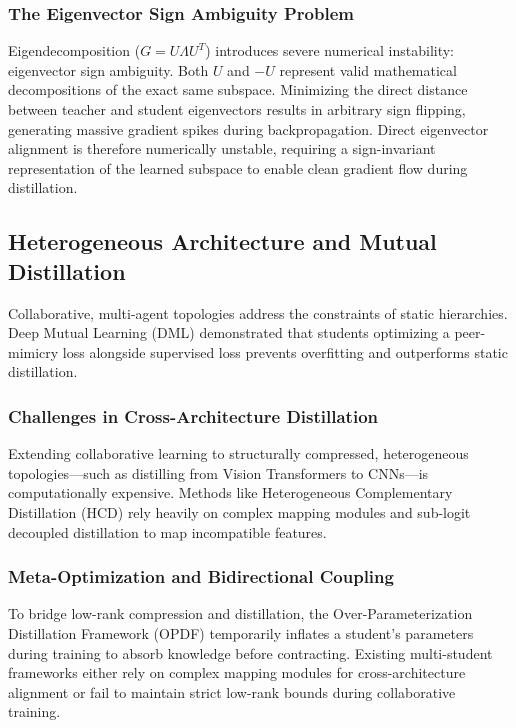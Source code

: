 \documentclass[conference]{IEEEtran}
\begin{document}
\subsubsection{The Eigenvector Sign Ambiguity Problem}
\par
Eigendecomposition ($G = U \Lambda U^T$) introduces severe numerical instability: eigenvector sign ambiguity. Both $U$ and $-U$ represent valid mathematical decompositions of the exact same subspace. Minimizing the direct distance between teacher and student eigenvectors results in arbitrary sign flipping, generating massive gradient spikes during backpropagation. Direct eigenvector alignment is therefore numerically unstable, requiring a sign-invariant representation of the learned subspace to enable clean gradient flow during distillation.


\subsection{Heterogeneous Architecture and Mutual Distillation}
\par
Collaborative, multi-agent topologies address the constraints of static hierarchies. Deep Mutual Learning (DML) \cite{zhang2018deep} demonstrated that students optimizing a peer-mimicry loss alongside supervised loss prevents overfitting and outperforms static distillation.


\subsubsection{Challenges in Cross-Architecture Distillation}
\par
Extending collaborative learning to structurally compressed, heterogeneous topologies—such as distilling from Vision Transformers to CNNs—is computationally expensive. Methods like Heterogeneous Complementary Distillation (HCD) \cite{xu2026heterogeneouscomplementarydistillation} rely heavily on complex mapping modules and sub-logit decoupled distillation to map incompatible features.


\subsubsection{Meta-Optimization and Bidirectional Coupling}
\par
To bridge low-rank compression and distillation, the Over-Parameterization Distillation Framework (OPDF) \cite{zhan2024overparameterizedstudentmodeltensor} temporarily inflates a student's parameters during training to absorb knowledge before contracting. Existing multi-student frameworks either rely on complex mapping modules for cross-architecture alignment or fail to maintain strict low-rank bounds during collaborative training.
\end{document}
